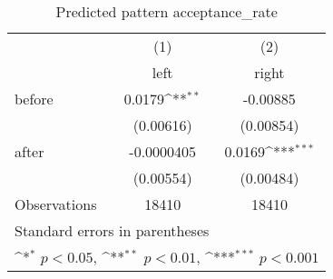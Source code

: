 \begin{table}[htbp]\centering
\def\sym#1{\ifmmode^{#1}\else\(^{#1}\)\fi}
\caption{Predicted pattern acceptance\_rate}
\begin{tabular}{l*{2}{c}}
\hline\hline
                    &\multicolumn{1}{c}{(1)}&\multicolumn{1}{c}{(2)}\\
                    &\multicolumn{1}{c}{left}&\multicolumn{1}{c}{right}\\
\hline
before              &      0.0179\sym{**} &    -0.00885         \\
                    &   (0.00616)         &   (0.00854)         \\
[1em]
after               &  -0.0000405         &      0.0169\sym{***}\\
                    &   (0.00554)         &   (0.00484)         \\
\hline
Observations        &       18410         &       18410         \\
\hline\hline
\multicolumn{3}{l}{\footnotesize Standard errors in parentheses}\\
\multicolumn{3}{l}{\footnotesize \sym{*} \(p<0.05\), \sym{**} \(p<0.01\), \sym{***} \(p<0.001\)}\\
\end{tabular}
\end{table}
